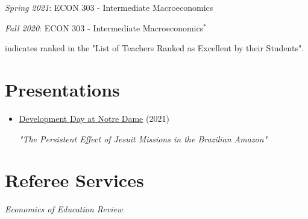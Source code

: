\documentclass[letterpaper,11pt]{article}
\begin{document}
\begin{adjustwidth}{9mm}{0mm}
  \textit{Spring 2021}: ECON 303 - Intermediate Macroeconomics
\end{adjustwidth}

\begin{adjustwidth}{9mm}{0mm}
  \textit{Fall 2020}: ECON 303 - Intermediate Macroeconomics$^*$
\end{adjustwidth}

\vspace{3mm}

\begin{adjustwidth}{3mm}{0mm}
  \scriptsize * indicates ranked in the "List of Teachers Ranked as Excellent by their Students".
\end{adjustwidth}


\section{Presentations}
\begin{adjustwidth}{3mm}{0mm}
  \begin{itemize}
    \item \href{https://kellogg.nd.edu/development-day-2021#tab-2998}{Development Day at Notre Dame} (2021) 
    
    \textit{"The Persistent Effect of Jesuit Missions in the Brazilian Amazon"}
  \end{itemize}
\end{adjustwidth}

\section{Referee Services}
\begin{adjustwidth}{3mm}{0mm}
\textit{Economics of Education Review}
\end{adjustwidth}
\end{document}
